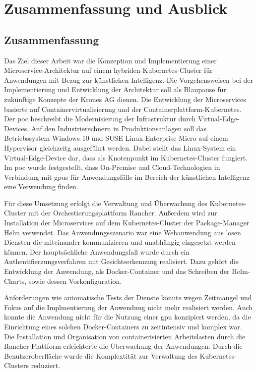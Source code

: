 \chapter{Zusammenfassung und Ausblick}
\section{Zusammenfassung}
Das Ziel dieser Arbeit war die Konzeption und Implementierung einer Microservice-Architektur auf einem hybriden-Kubernetes-Cluster für Anwendungen mit Bezug zur künstlichen Intelligenz.
Die Vorgehensweisen bei der Implementierung und Entwicklung der Architektur soll als Blaupause für zukünftige Konzepte der Krones AG dienen.
Die Entwicklung der Microservices basierte auf Containervirtualisierung und der Containerplattform-Kubernetes.
Der \acs{poc} beschreibt die Modernisierung der Infrastruktur durch Virtual-Edge-Devices.
Auf den Industrierechnern in Produktionsanlagen soll das Betriebssystem Windows 10 und SUSE Linux Enterprise Micro auf einem Hypervisor gleichzeitg ausgeführt werden.
Dabei stellt das Linux-System ein Virtual-Edge-Device dar, dass als Knotenpunkt im Kubernetes-Cluster fungiert.
Im \acs{poc} wurde festgestellt, dass On-Premise und Cloud-Technologien in Verbindung mit \ac{gpu}s für Anwendungsfälle im Bereich der künstlichen Intelligenz eine Verwendung finden.

Für diese Umsetzung erfolgt die Verwaltung und Überwachung des Kubernetes-Cluster mit der Orchestierungsplattform Rancher.
Außerdem wird zur Installation der Microservices auf dem Kubernetes-Cluster der Package-Manager Helm verwendet.
Das Anwendungsszenario war eine Webanwendung aus losen Diensten die miteinander kommunizieren und unabhängig eingesetzt werden können.
Der hauptsächliche Anwendungsfall wurde durch ein Authentifierzungsverfahren mit Gesichtserkennung realisiert.
Dazu gehört die Entwicklung der Anwendung, als Docker-Container und das Schreiben der Helm-Charts, sowie dessen Vorkonfiguration.

Anforderungen wie automatische Tests der Dienste konnte wegen Zeitmangel und Fokus auf die Implmentierung der Anwendung nicht mehr realisiert werden.
Auch konnte die Anwendung nicht für die Nutzung einer \acs{gpu} konzipiert werden,
da die Einrichtung eines solchen Docker-Containers zu zeitintensiv und komplex war.
Die Installation und Organisation von containerisierten Arbeitslasten durch die Rancher-Plattform erleichterte die Überwachung der Anwendungen.
Durch die Benutzeroberfläche wurde die Komplextität zur Verwaltung des Kubernetes-Clusters reduziert.

